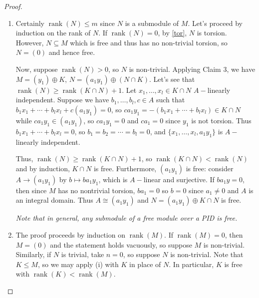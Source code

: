 \documentclass[11pt, a4paper]{memoir}
\theoremstyle{change}
\theoremstyle{plain}
\theoremstyle{nonumberplain}
\newtheorem{proof}{Proof}
\DeclareMathOperator{\rank}{rank}
\numberwithin{equation}{section}
\begin{document}
\begin{proof}
    \begin{enumerate}
        \item Certainly $\rank(N)\leq m$ since $N$ is a submodule of $M$.
            Let's proceed by induction on the rank of $N$.
            If $\rank(N)=0$, by \cref{tor}, $N$ is torsion.
            However, $N\subseteq M$ which is free and thus has no non-trivial torsion, so $N=(0)$ and hence free.

            Now, suppose $\rank(N)>0$, so $N$ is non-trivial.
            Applying Claim 3, we have $M=(y_1)\oplus K$, $N=(a_1y_1)\oplus(N\cap K)$.
            Let's see that $\rank(N)\geq\rank(K\cap N)+1$.
            Let $x_1,\ldots,x_l\in K\cap N$ $A-$linearly independent.
            Suppose we have $b_1,\ldots,b_l,c\in A$ such that $b_1x_1+\cdots+b_lx_l+c(a_1y_1)=0$, so $ca_1y_1=-(b_1x_1+\cdots+b_lx_l)\in K\cap N$ while $ca_1y_1\in (a_1y_1)$, so $ca_1y_1=0$ and $ca_1=0$ since $y_1$ is not torsion.
            Thus $b_1x_1+\cdots+b_lx_l=0$, so $b_1=b_2=\cdots=b_l=0$, and $\{x_1,\ldots,x_l,a_1y_1\}$ is $A-$linearly independent.

            Thus, $\rank(N)\geq\rank(K\cap N)+1$, so $\rank(K\cap N)<\rank(N)$ and by induction, $K\cap N$ is free.
            Furthermore, $(a_1y_1)$ is free: consider $A\to(a_1y_1)$ by $b\mapsto ba_1y_1$, which is $A-$linear and surjective.
            If $ba_1y=0$, then since $M$ has no nontrivial torsion, $ba_1=0$ so $b=0$ since $a_1\neq 0$ and $A$ is an integral domain.
            Thus $A\cong(a_1y_1)$ and $N=(a_1y_1)\oplus K\cap N$ is free.

            \textit{Note that in general, any submodule of a free module over a PID is free.}

        \item The proof proceeds by induction on $\rank(M)$.
            If $\rank(M)=0$, then $M=(0)$ and the statement holds vacuously, so suppose $M$ is non-trivial.
            Similarly, if $N$ is trivial, take $n=0$, so suppose $N$ is non-trivial.
            Note that $K\leq M$, so we may apply (i) with $K$ in place of $N$.
            In particular, $K$ is free with $\rank(K)<\rank(M)$.


\end{enumerate}
\end{proof}
\end{document}
